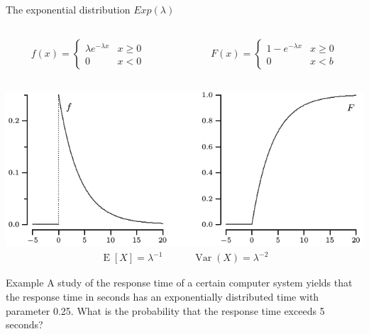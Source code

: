 \documentclass{beamer}
\newcommand{\E}{\operatorname{E}}
\newcommand{\Var}{\operatorname{Var}}
\begin{document}
\begin{frame}{The exponential distribution $Exp(\lambda)$}
  \begin{columns}
    \begin{column}{0.5\textwidth}
      \begin{align*}
        f(x) =
        \begin{cases}
          \lambda e^{-\lambda x} & x \geq 0 \\
          0 & x < 0
        \end{cases}
      \end{align*}
    \end{column}
    \begin{column}{0.5\textwidth}
      \begin{align*}
        F(x) =
        \begin{cases}
          1 - e^{-\lambda x} & x \geq 0\\
          0 & x < b
        \end{cases}
      \end{align*}
    \end{column}
  \end{columns}
  \includegraphics[width=\linewidth]{exp-pdf}
  \begin{align*}
    \E[X]=\lambda^{-1}\quad\quad\quad\Var(X)=\lambda^{-2}
  \end{align*}
\end{frame}

\begin{frame}[t]{Example}
  A study of the response time of a certain computer system yields that the
  response time in seconds has an exponentially distributed time with parameter
  0.25. What is the probability that the response time exceeds 5 seconds?
\end{frame}
\end{document}

